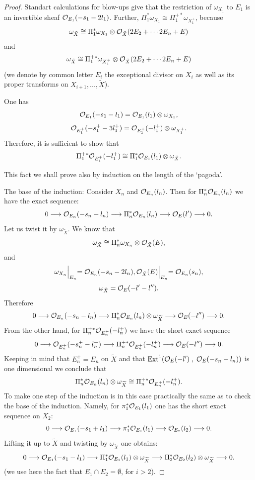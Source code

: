\documentclass[12pt]{article}
\def\lto{\longrightarrow}
\def\o#1{{\cal O}_{#1}}
\begin{document}
\begin{proof}
Standart calculations for blow-ups give that the restriction of $\omega_{ X_1}$ to $E_1$ is an invertible sheaf ${\o {E_1}}(-s_1-2l_1)$. Further, $\Pi_1^*\omega_{X_1}\cong\Pi_1^{+*}\omega_{X_1^+}$, because
$$
\omega_{\tilde X}\cong\Pi_1^*\omega_{X_1}\otimes{\o {\tilde X}}(2E_2+\cdots 2E_n +E)
$$
and
$$
 \omega_{\tilde X}\cong\Pi_1^{+*}\omega_{X_1^+}\otimes{\o {\tilde X}}(2E_2+\cdots 2E_n +E)
$$
(we denote by common letter $E_i$ the exceptional divisor on $X_i$ as well as its proper transforms on $X_{i+1},...,{\widetilde X}$).

One has
$$
{\o {E_1}}(-s_1-l_1)={\o {E_1}}(l_1)\otimes\omega_{X_1},
$$
$$
{\o {E_1^+}}(-s_1^+-3l_1^+)={\o {E_1^+}}(-l_1^+)\otimes\omega_{X_1^+}.
$$
Therefore, it is sufficient to show that
$$
\Pi^{+*}_1{\o {E_1^+}}(-l_1^+)\cong \Pi^*_1{\o {E_1}}(l_1)\otimes\omega_{\tilde X}.
$$
 
This fact we shall prove also by induction on the length of the `pagoda'.

The base of the induction:  Consider $X_n$ and ${\o {E_n}}(l_n)$. Then for $\Pi^*_n{\o {E_n}}(l_n)$ we have the exact sequence:
$$
0\lto{\o {E_n}}(-s_n+l_n)\lto\Pi^*_n{\o {E_n}}(l_n)\lto 
{\o E}(l')\lto 0.
$$
Let us twist it by $\omega_{\tilde X}$. We know that
$$
\omega_{\tilde X}\cong\Pi_n^*\omega_{X_n}\otimes{\o {\tilde X}}(E),
$$
and
$$
\omega_{X_n}\Bigl|_{E_n}={\o {E_n}}(-s_n-2l_n), {\o {\tilde X}}(E)\Bigl|_{E_n}={\o {E_n}}(s_n),
$$
$$
\omega_{\tilde X}={\o E}(-l'-l'').
$$
Therefore
$$
0\longrightarrow {\cal O}_{E_n}(-s_n-l_n)\longrightarrow \Pi^*_n {\cal O}_{E_n}(l_n)\otimes\omega_{\widetilde X}\longrightarrow{\cal O}_{E}(-l'')\longrightarrow 0.
$$
From the other hand, for $\Pi^{+*}_n {\cal O}_{E^+_n}(-l^+_n)$
we have the short exact sequence
$$
0\longrightarrow {\cal O}_{E^+_n}(-s^+_n-l^+_n)\longrightarrow \Pi^{+*}_n {\cal O}_{E^+_n}(-l^+_n)\longrightarrow{\cal O}_{E}(-l'')\longrightarrow 0.
$$
Keeping in mind that $E_n^+=E_n$ on $\widetilde X$ and that ${\rm Ext}^1({\cal O}_E(-l')\;,\; {\cal O}_E(-s_n-l_n))$ is one dimensional we conclude that
$$
\Pi_n^*{\cal O}_{E_n}(l_n)\otimes \omega_{\widetilde X}\cong\Pi_n^{+*}{\cal O}_{E^+_n}(-l^+_n).
$$
To make one step of the induction is in this case practically the same as to check the base of the induction. Namely, for 
$\pi_1^*{\cal O}_{E_1}(l_1)$ one has the short exact sequence on $X_2$:
$$
0\longrightarrow {\cal O}_{E_1}(-s_1+l_1)\longrightarrow \pi^{*}_1 {\cal O}_{E_1}(l_1)\longrightarrow{\cal O}_{E_2}(l_2)\longrightarrow 0.
$$
Lifting it up to ${\widetilde X}$ and twisting by $\omega_{\widetilde X}$ one obtains:
$$
0\longrightarrow {\cal O}_{E_1}(-s_1-l_1)\longrightarrow \Pi^*_1 {\cal O}_{E_1}(l_1)\otimes \omega_{\widetilde X}\longrightarrow\Pi^*_2{\cal O}_{E_2}(l_2)\otimes\omega_{\widetilde X}\longrightarrow 0.
$$
(we use here the fact that $E_1\cap E_2=\emptyset$, for $i>2$).


\end{proof}
\end{document}
